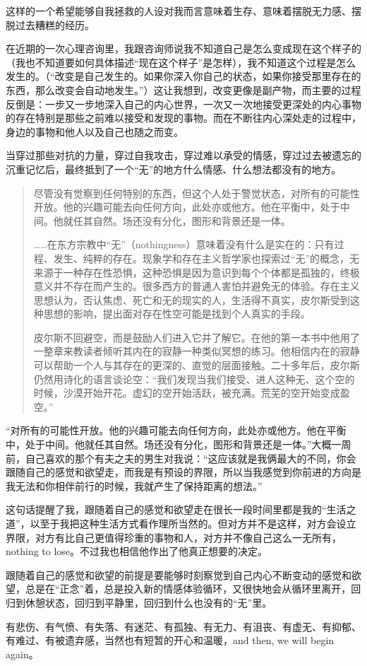 这样的一个希望能够自我拯救的人设对我而言意味着生存、意味着摆脱无力感、摆脱过去糟糕的经历。

在近期的一次心理咨询里，我跟咨询师说我不知道自己是怎么变成现在这个样子的（我也不知道要如何具体描述“现在这个样子”是怎样），我不知道这个过程是怎么发生的。（“改变是自己发生的。如果你深入你自己的状态，如果你接受那里存在的东西，那么改变会自动地发生。”）这让我想到，改变更像是副产物，而主要的过程反倒是：一步又一步地深入自己的内心世界，一次又一次地接受更深处的内心事物的存在\pozhehao{}特别是那些之前难以接受和发现的事物。而在不断往内心深处走的过程中，身边的事物和他人以及自己也随之而变。

当穿过那些对抗的力量，穿过自我攻击，穿过难以承受的情感，穿过过去被遗忘的沉重记忆后，最终抵到了一个“无”的地方\pozhehao{}什么情感、什么想法都没有的地方。

\blockquote{
	尽管没有觉察到任何特别的东西，但这个人处于警觉状态，对所有的可能性开放。他的兴趣可能去向任何方向，此处亦或他方。他在平衡中，处于中间。他就任其自然。场还没有分化，图形和背景还是一体。

	……在东方宗教中“无”（nothingness）意味着没有什么是实在的：只有过程、发生、纯粹的存在。现象学和存在主义哲学家也探索过“无”的概念，无来源于一种存在性恐惧，这种恐惧是因为意识到每个个体都是孤独的，终极意义并不存在而产生的。很多西方的普通人害怕并避免无的体验。存在主义思想认为，否认焦虑、死亡和无的现实的人，生活得不真实，皮尔斯受到这种思想的影响，提出面对存在性空可能是找到个人真实的手段。

	皮尔斯不回避空，而是鼓励人们进入它并了解它。在他的第一本书中他用了一整章来教读者倾听其内在的寂静\pozhehao{}一种类似冥想的练习。他相信内在的寂静可以帮助一个人与其存在的更深的、直觉的层面接触。二十多年后，皮尔斯仍然用诗化的语言谈论空：“我们发现当我们接受、进人这种无、这个空的时候，沙漠开始开花。虚幻的空开始活跃，被充满。荒芜的空开始变成盈空。”

}

“对所有的可能性开放。他的兴趣可能去向任何方向，此处亦或他方。他在平衡中，处于中间。他就任其自然。场还没有分化，图形和背景还是一体。”大概一周前，自己喜欢的那个有夫之夫的男生对我说：“这应该就是我俩最大的不同，你会跟随自己的感觉和欲望走，而我是有预设的界限，所以当我感觉到你前进的方向是我无法和你相伴前行的时候，我就产生了保持距离的想法。”

这句话提醒了我，跟随着自己的感觉和欲望走在很长一段时间里都是我的“生活之道”，以至于我把这种生活方式看作理所当然的。但对方并不是这样，对方会设立界限，对方有比自己更值得珍重的事物和人，对方并不像自己这么一无所有，nothing to lose。不过我也相信他作出了他真正想要的决定。

跟随着自己的感觉和欲望的前提是要能够时刻察觉到自己内心不断变动的感觉和欲望，总是在“正念”着，总是投入新的情感体验循环，又很快地会从循环里离开，回归到休憩状态，回归到平静里，回归到什么也没有的“无”里。

有悲伤、有气愤、有失落、有迷茫、有孤独、有无力、有沮丧、有虚无、有抑郁、有难过、有被遗弃感，当然也有短暂的开心和温暖，and then, we will begin again。
